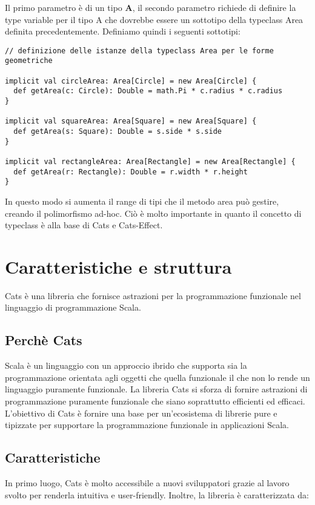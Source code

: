 \noindent Il primo parametro è di un tipo \textbf{A}, il secondo parametro richiede di definire la type variable per il tipo A che dovrebbe essere un sottotipo della typeclass Area definita precedentemente. Definiamo quindi i seguenti sottotipi:

\begin{verbatim}
// definizione delle istanze della typeclass Area per le forme geometriche

implicit val circleArea: Area[Circle] = new Area[Circle] {
  def getArea(c: Circle): Double = math.Pi * c.radius * c.radius
}

implicit val squareArea: Area[Square] = new Area[Square] {
  def getArea(s: Square): Double = s.side * s.side
}

implicit val rectangleArea: Area[Rectangle] = new Area[Rectangle] {
  def getArea(r: Rectangle): Double = r.width * r.height
}
\end{verbatim}

\noindent In questo modo si aumenta il range di tipi che il metodo area può gestire, creando il polimorfismo ad-hoc. Ciò è molto importante in quanto il concetto di typeclass è alla base di Cats e Cats-Effect.

\section{Caratteristiche e struttura}
Cats è una libreria che fornisce astrazioni per la programmazione funzionale nel linguaggio di programmazione Scala. 

\subsection{Perchè Cats}
Scala è un linguaggio con un approccio ibrido che supporta sia la programmazione orientata agli oggetti che quella funzionale il che non lo rende un linguaggio puramente funzionale. La libreria Cats si sforza di fornire astrazioni di programmazione puramente funzionale che siano soprattutto efficienti ed efficaci. L’obiettivo di Cats è fornire una base per un’ecosistema di librerie pure e tipizzate per supportare la programmazione funzionale in applicazioni Scala.

\subsection{Caratteristiche}
In primo luogo, Cats è molto accessibile a nuovi sviluppatori grazie al lavoro svolto per renderla intuitiva e user-friendly. Inoltre, la libreria è caratterizzata da:

